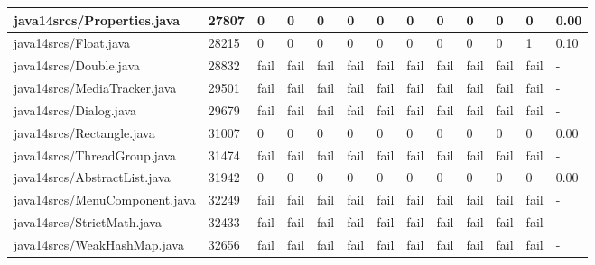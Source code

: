 \begin{tabular}{|l|l|l|l|l|l|l|l|l|l|l|l|l|}
\hline
java14srcs/Properties.java                         & 27807       & 0         & 0         & 0         & 0         & 0         & 0         & 0         & 0         & 0         & 0         & 0.00      \\
\hline
java14srcs/Float.java                              & 28215       & 0         & 0         & 0         & 0         & 0         & 0         & 0         & 0         & 0         & 1         & 0.10      \\
\hline
java14srcs/Double.java                             & 28832       & fail      & fail      & fail      & fail      & fail      & fail      & fail      & fail      & fail      & fail      & -         \\
\hline
java14srcs/MediaTracker.java                       & 29501       & fail      & fail      & fail      & fail      & fail      & fail      & fail      & fail      & fail      & fail      & -         \\
\hline
java14srcs/Dialog.java                             & 29679       & fail      & fail      & fail      & fail      & fail      & fail      & fail      & fail      & fail      & fail      & -         \\
\hline
java14srcs/Rectangle.java                          & 31007       & 0         & 0         & 0         & 0         & 0         & 0         & 0         & 0         & 0         & 0         & 0.00      \\
\hline
java14srcs/ThreadGroup.java                        & 31474       & fail      & fail      & fail      & fail      & fail      & fail      & fail      & fail      & fail      & fail      & -         \\
\hline
java14srcs/AbstractList.java                       & 31942       & 0         & 0         & 0         & 0         & 0         & 0         & 0         & 0         & 0         & 0         & 0.00      \\
\hline
java14srcs/MenuComponent.java                      & 32249       & fail      & fail      & fail      & fail      & fail      & fail      & fail      & fail      & fail      & fail      & -         \\
\hline
java14srcs/StrictMath.java                         & 32433       & fail      & fail      & fail      & fail      & fail      & fail      & fail      & fail      & fail      & fail      & -         \\
\hline
java14srcs/WeakHashMap.java                        & 32656       & fail      & fail      & fail      & fail      & fail      & fail      & fail      & fail      & fail      & fail      & -         \\

\end{tabular}
